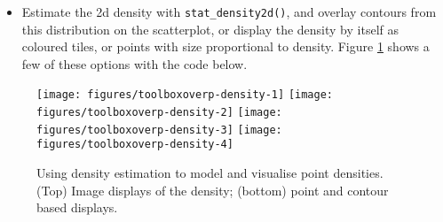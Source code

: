 \begin{itemize}
\itemsep1pt\parskip0pt
\item
  Estimate the 2d density with \texttt{stat\_density2d()}, and overlay
  contours from this distribution on the scatterplot, or display the
  density by itself as coloured tiles, or points with size proportional
  to density. Figure \ref{fig:overp-density} shows a few of these
  options with the code below. 
\end{itemize}

\begin{Shaded}
\begin{Highlighting}[]
\StringTok{ }\StringTok{ }\NormalTok{(}\NormalTok{,}\NormalTok{) +}\StringTok{ }
\StringTok{  }\NormalTok{(} \NormalTok{)}
\StringTok{ }\NormalTok{() +}\StringTok{ }\NormalTok{()}
\StringTok{ }\NormalTok{(} \NormalTok{, }\NormalTok{(} 
                    \StringTok{ }\NormalTok{(} \NormalTok{(}\NormalTok{, }\NormalTok{))}
\StringTok{ }\NormalTok{(} \NormalTok{, }\NormalTok{(} 
                    
\NormalTok{() +}\StringTok{ }\NormalTok{(} \NormalTok{(}\NormalTok{,}\NormalTok{))}
\end{Highlighting}
\end{Shaded}

\begin{figure}

{\centering \texttt{[image: figures/toolboxoverp-density-1]} \texttt{[image: figures/toolboxoverp-density-2]} \texttt{[image: figures/toolboxoverp-density-3]} \texttt{[image: figures/toolboxoverp-density-4]} 

}

\caption{Using density estimation to model and visualise point densities.  (Top) Image displays of the density; (bottom) point and contour based displays.\label{fig:overp-density}}
\end{figure}

